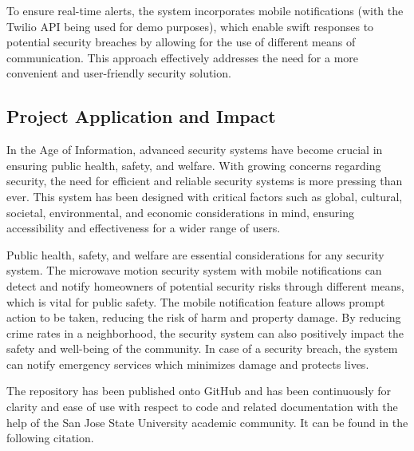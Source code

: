 To ensure real-time alerts, the system incorporates mobile notifications (with the Twilio API
being used for demo purposes), which enable swift responses to potential security breaches by
allowing for the use of different means of communication. This approach effectively addresses
the need for a more convenient and user-friendly security solution.

\subsection{Project Application and Impact}\label{subsec:project-application-and-impact}

In the Age of Information, advanced security systems have become crucial in ensuring public
health, safety, and welfare. With growing concerns regarding security, the need for
efficient and reliable security systems is more pressing than ever. This system has been designed
with critical factors such as global, cultural, societal, environmental, and economic
considerations in mind, ensuring accessibility and effectiveness for a wider range of users.

Public health, safety, and welfare are essential considerations for any security system.
The microwave motion security system with mobile notifications can detect and notify homeowners
of potential security risks through different means, which is vital for public safety.
The mobile notification feature allows prompt action to be taken, reducing the risk of
harm and property damage. By reducing crime rates in a neighborhood, the security system
can also positively impact the safety and well-being of the community. In case of a
security breach, the system can notify emergency services which minimizes damage and protects lives.

The repository has been published onto GitHub and has been continuously for clarity and ease of
use with respect to code and related documentation with the help of the San Jose State
University academic community. It can be found in the following citation. \cite{MorteSense-2023}